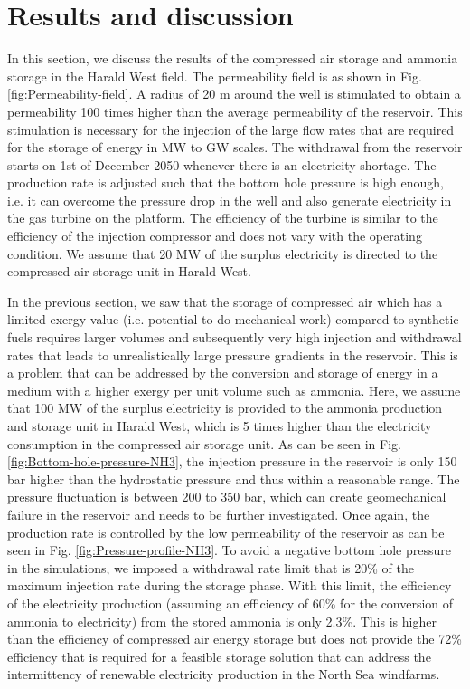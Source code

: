 \documentclass{ECOS_2021}
\begin{document}
\sffamily \Large \section{Results and discussion}
\rmfamily \normalsize
In this section, we discuss the results of the compressed air storage
and ammonia storage in the Harald West field. The permeability field
is as shown in Fig. \ref{fig:Permeability-field}. A radius of 20
m around the well is stimulated to obtain a permeability 100 times
higher than the average permeability of the reservoir. This stimulation
is necessary for the injection of the large flow rates that are required
for the storage of energy in MW to GW scales. The withdrawal from
the reservoir starts on 1st of December 2050 whenever there is an
electricity shortage. The production rate is adjusted such that the
bottom hole pressure is high enough, i.e. it can overcome the pressure
drop in the well and also generate electricity in the gas turbine
on the platform. The efficiency of the turbine is similar to the efficiency
of the injection compressor and does not vary with the operating condition.
We assume that 20 MW of the surplus electricity is directed to the
compressed air storage unit in Harald West.

In the previous section, we saw that the storage of compressed air
which has a limited exergy value (i.e. potential to do mechanical
work) compared to synthetic fuels requires larger volumes and subsequently
very high injection and withdrawal rates that leads to unrealistically
large pressure gradients in the reservoir. This is a problem that
can be addressed by the conversion and storage of energy in a medium
with a higher exergy per unit volume such as ammonia. Here, we assume
that 100 MW of the surplus electricity is provided to the ammonia
production and storage unit in Harald West, which is 5 times higher
than the electricity consumption in the compressed air storage unit.
As can be seen in Fig. \ref{fig:Bottom-hole-pressure-NH3}, the injection
pressure in the reservoir is only 150 bar higher than the hydrostatic
pressure and thus within a reasonable range. The pressure fluctuation
is between 200 to 350 bar, which can create geomechanical failure
in the reservoir and needs to be further investigated. Once again,
the production rate is controlled by the low permeability of the reservoir
as can be seen in Fig. \ref{fig:Pressure-profile-NH3}. To avoid a
negative bottom hole pressure in the simulations, we imposed a withdrawal
rate limit that is 20\% of the maximum injection rate during the storage
phase. With this limit, the efficiency of the electricity production
(assuming an efficiency of 60\% for the conversion of ammonia to electricity)
from the stored ammonia is only 2.3\%. This is higher than the efficiency
of compressed air energy storage but does not provide the 72\% efficiency
that is required for a feasible storage solution that can address
the intermittency of renewable electricity production in the North
Sea windfarms.
\end{document}
